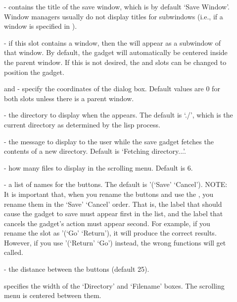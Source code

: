 \begin{description}
\item[]  - contains the title of the save window, which is by
default `Save Window'.  Window managers usually do not display titles for
subwindows (i.e., if a window is specified in ).

\item[]  - if this slot contains a window, then the 
will appear as a subwindow of that window.  By default, the
gadget will automatically be centered inside the parent window.  If
this is not desired, the  and  slots can be
changed to position the gadget.

\item[]  and  - specify the coordinates of the dialog
box.  Default values are 0 for both slots unless there is a parent
window.

\item[]  - the directory to display when the 
appears.  The default is `./', which is the current directory as determined
by the lisp process.

\item[]  - the message to display to the user while the save
gadget fetches the contents of a new directory.  Default is
`Fetching directory...'.

\item[]  - how many files to display in the scrolling menu.
Default is 6.

\item[]  - a list of names for the buttons.  The default is
'(`Save' `Cancel').
NOTE: It is important that, when you rename the buttons and use the
, you rename them in the `Save' `Cancel' order.
That is, the label that should cause the gadget to save must appear first in
the  list, and the label that cancels the gadget's action must
appear second.  For example, if you rename the  slot
as '(`Go' `Return'), it will produce the correct results.  However, if you use
'(`Return' `Go') instead, the wrong functions will get called.

\item[]  - the distance between the buttons (default 25).

\item[]  specifies the width of the `Directory' and
`Filename' boxes.  The scrolling menu is centered between them.


\end{description}
